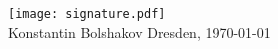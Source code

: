 \documentclass[11pt,a4paper,sans]{moderncv}        %
\begin{document}

\vfill 
\texttt{[image: signature.pdf]}\\%
Konstantin Bolshakov
\hfill Dresden, \myformat\today
\end{document}
